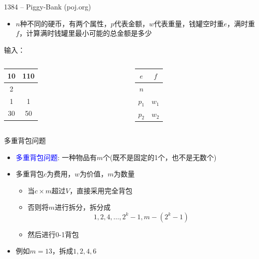 \begin{frame}{1384 -- Piggy-Bank (poj.org)}
    \begin{itemize}
        \item $n$种不同的硬币，有两个属性，$p$代表金额，$w$代表重量，钱罐空时重$e$，满时重$f$，计算满时钱罐里最小可能的总金额是多少
    \end{itemize}
    \vfill
    \begin{exampleblock}{输入：}
        \begin{columns}
            \begin{table}
                \begin{tabular}{cc}
                10 & 110 \\\hline
                2 &  \\\hline
                1 & 1 \\\hline
                \alert{30} & \alert{50} \\\hline
                \end{tabular}
            \end{table}
            \begin{table}
                \begin{tabular}{cc}
                $e$ & $f$ \\\hline
                $n$ \\\hline
                $p_1$ & $w_1$ \\\hline
                $p_2$ & $w_2$ \\\hline
                \end{tabular}
            \end{table}
        \end{columns}
    \end{exampleblock}
\end{frame}  
\begin{frame}{多重背包问题}
    \begin{itemize}
        \item \textcolor{blue}{多重背包问题}: 一种物品有$m$个(既不是固定的1个，也不是无数个)
        \vfill
        \item 多重背包$c$为费用，$w$为价值，$m$为数量
        \begin{itemize}                
            \item 当$c\times m$超过$V$，直接采用完全背包
            \item 否则将$m$进行拆分，拆分成$$1,2,4,…,2^k-1,𝑚−(2^k-1)$$
            \item 然后进行0-1背包
        \end{itemize}
        \vfill
        \item 例如$m=13$，拆成$1,2,4,6$
    \end{itemize}
\end{frame}       
